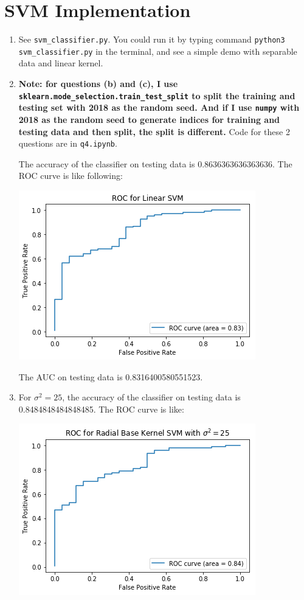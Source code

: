 \documentclass[paper=letter, fontsize=12pt]{article}
\begin{document}
\section{SVM Implementation}
\begin{enumerate}[label=(\alph*)]
	\item See \texttt{svm\_classifier.py}. You could run it by typing command \texttt{python3 svm\_classifier.py} in the terminal, and see a simple demo with separable data and linear kernel.
	
	\item \textbf{Note: for questions (b) and (c), I use \texttt{sklearn.mode\_selection.train\_test\_split} to split the training and testing set with 2018 as the random seed. And if I use \texttt{numpy} with 2018 as the random seed to generate indices for training and testing data and then split, the split is different.} Code for these 2 questions are in \texttt{q4.ipynb}.
	
	The accuracy of the classifier on testing data is 0.8636363636363636. The ROC curve is like following:
	
	\includegraphics[scale=0.6]{q4b.png}
	
	The AUC on testing data is 0.8316400580551523.
	
	\item For $\sigma^2 = 25$, the accuracy of the classifier on testing data is 0.8484848484848485. The ROC curve is like:
	
	\includegraphics[scale=0.6]{q4c1.png}
	

\end{enumerate}
\end{document}
